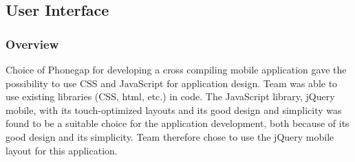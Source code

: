 \subsection{User Interface}
	\subsubsection{Overview}
	Choice of Phonegap for developing a cross compiling mobile application gave the possibility to use CSS and JavaScript for application design. Team was able to use existing libraries (CSS, html, etc.) in code. The JavaScript library, jQuery mobile, with its touch-optimized layouts and its good design and simplicity was found to be a suitable choice for the application development, both because of its good design and its simplicity. Team therefore chose to use the jQuery mobile layout for this application.

